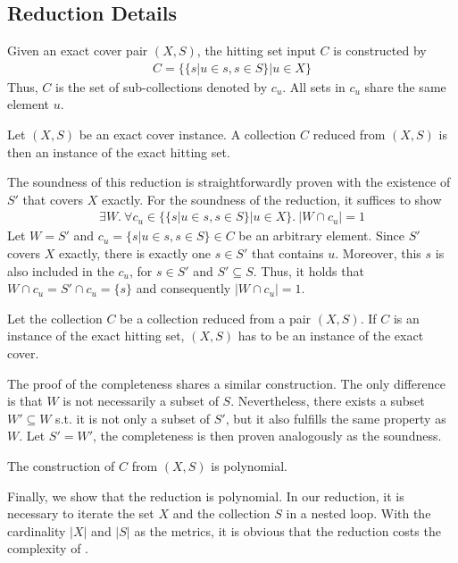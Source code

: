 \subsection{Reduction Details}
Given an exact cover pair $(X, S)$, the hitting set input $C$ is constructed by 
\begin{align*}
    C = \{\{s | u \in s, s \in S \} | u \in X\}
\end{align*}
Thus, $C$ is the set of sub-collections denoted by $c_u$. All sets in $c_u$ share the same element $u$.
\begin{lemma}[Soundess]
    Let $(X, S)$ be an exact cover instance. A collection $C$ reduced from $(X, S)$ is then an instance of the exact hitting set.
\end{lemma}
The soundness of this reduction is straightforwardly proven with the existence of $S'$ that covers $X$ exactly.
For the soundness of the reduction, it suffices to show 
\begin{align*}
    \exists W.\ \forall c_u \in \{\{s | u \in s, s \in S \} | u \in X\}.\ |W \cap c_u| = 1
\end{align*}
Let $W = S'$ and $c_u = \{s | u \in s, s \in S \} \in C$ be an arbitrary element. 
Since $S'$ covers $X$ exactly, there is exactly one $s \in S'$ that contains $u$. Moreover, this $s$
is also included in the $c_u$, for $s \in S'$ and $S' \subseteq S$. Thus, it holds that $W \cap c_u = S' \cap c_u = \{s\}$ and consequently $|W \cap c_u| = 1$.
\begin{lemma}[Completeness]
    Let the collection $C$ be a collection reduced from a pair $(X, S)$. If $C$ is an instance of the exact hitting set, 
    $(X, S)$ has to be an instance of the exact cover.
\end{lemma}
The proof of the completeness shares a similar construction. The only difference is that $W$ is not 
necessarily a subset of $S$. Nevertheless, there exists a subset $W' \subseteq W$ s.t. it is not only a subset of $S'$, but it
also fulfills the same property as $W$. Let $S' = W'$, the completeness is then proven analogously as the soundness. 
\begin{lemma}
    The construction of $C$ from $(X, S)$ is polynomial. 
\end{lemma}
Finally, we show that the reduction is polynomial. In our reduction, it is necessary to iterate the set $X$ and the collection $S$ in a nested loop. 
With the cardinality $|X|$ and $|S|$ as the metrics, it is obvious that the reduction costs the complexity of .

